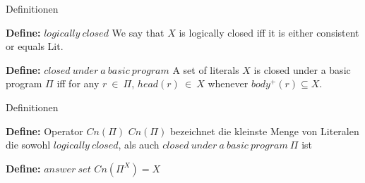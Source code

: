 \begin{frame}{Definitionen}
  \begin{block}{\textbf{Define:} $logically~closed$}
    We say that $X$ is logically closed iff it is either consistent or equals Lit.
  \end{block}
  \begin{block}{\textbf{Define:} $closed~under~a~basic~program$}
    A set of literals $X$ is closed under a basic program $\Pi$ iff for
    any $r~\in~\Pi$, $head(r)~\in~X$ whenever $body^+(r) \subseteq X$.
  \end{block}
\end{frame}


\begin{frame}{Definitionen}
  \begin{block}{\textbf{Define:} Operator $Cn(\Pi)$}
  $Cn(\Pi)$ bezeichnet die kleinste Menge von Literalen die sowohl
  $logically~closed$, als auch $closed~under~a~basic~program~\Pi$ ist
  \end{block}
  \begin{block}{\textbf{Define:} $answer~set$}
    $Cn(\Pi^X)=X$
  \end{block}
\end{frame}


